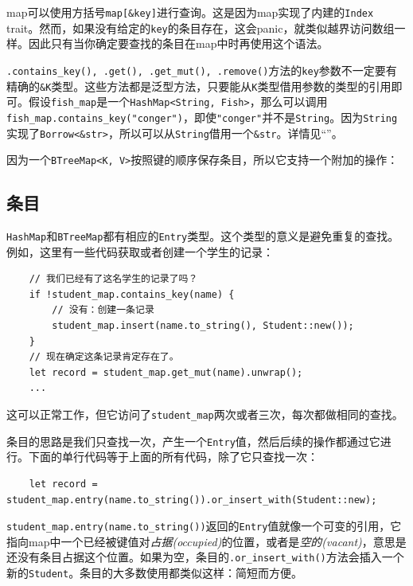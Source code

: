 
map可以使用方括号\texttt{map[\&key]}进行查询。这是因为map实现了内建的\texttt{Index} trait。然而，如果没有给定的\texttt{key}的条目存在，这会panic，就类似越界访问数组一样。因此只有当你确定要查找的条目在map中时再使用这个语法。

\texttt{.contains\_key(), .get(), .get\_mut(), .remove()}方法的\texttt{key}参数不一定要有精确的\texttt{\&K}类型。这些方法都是泛型方法，只要能从\texttt{K}类型借用参数的类型的引用即可。假设\texttt{fish\_map}是一个\texttt{HashMap<String, Fish>}，那么可以调用\texttt{fish\_map.contains\_key("conger")}，即使\texttt{"conger"}并不是\texttt{String}。因为\texttt{String}实现了\texttt{Borrow<\&str>}，所以可以从\texttt{String}借用一个\texttt{\&str}。详情见“”。

因为一个\texttt{BTreeMap<K, V>}按照键的顺序保存条目，所以它支持一个附加的操作：

\subsection{条目}\label{entry}
\texttt{HashMap}和\texttt{BTreeMap}都有相应的\texttt{Entry}类型。这个类型的意义是避免重复的查找。例如，这里有一些代码获取或者创建一个学生的记录：
\begin{verbatim}
    // 我们已经有了这名学生的记录了吗？
    if !student_map.contains_key(name) {
        // 没有：创建一条记录
        student_map.insert(name.to_string(), Student::new());
    }
    // 现在确定这条记录肯定存在了。
    let record = student_map.get_mut(name).unwrap();
    ...
\end{verbatim}

这可以正常工作，但它访问了\texttt{student\_map}两次或者三次，每次都做相同的查找。

条目的思路是我们只查找一次，产生一个\texttt{Entry}值，然后后续的操作都通过它进行。下面的单行代码等于上面的所有代码，除了它只查找一次：
\begin{verbatim}
    let record = student_map.entry(name.to_string()).or_insert_with(Student::new);
\end{verbatim}

\texttt{student\_map.entry(name.to\_string())}返回的\texttt{Entry}值就像一个可变的引用，它指向map中一个已经被键值对\emph{占据(occupied)}的位置，或者是\emph{空的(vacant)}，意思是还没有条目占据这个位置。如果为空，条目的\texttt{.or\_insert\_with()}方法会插入一个新的\texttt{Student}。条目的大多数使用都类似这样：简短而方便。

